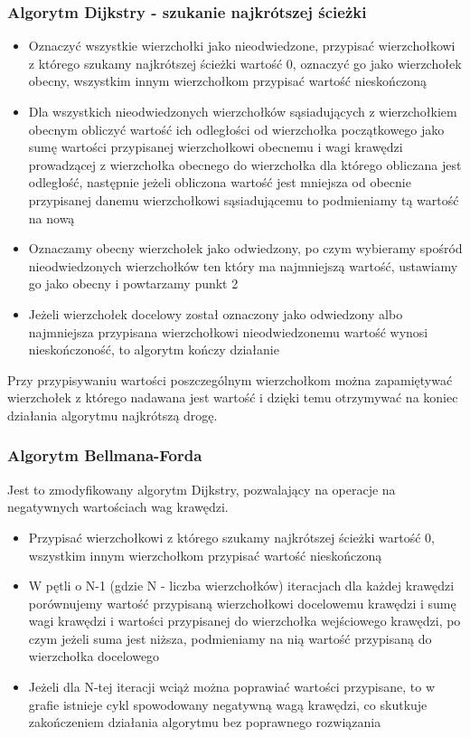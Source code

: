 \documentclass[a4paper,12pt]{article}
\newcommand\tab[1][1cm]{\hspace*{#1}}
\begin{document}
\subsubsection{Algorytm Dijkstry - szukanie najkrótszej ścieżki}
\tab
\begin{itemize}

\item Oznaczyć wszystkie wierzchołki jako nieodwiedzone, przypisać wierzchołkowi z którego szukamy najkrótszej ścieżki wartość 0, oznaczyć go jako wierzchołek obecny, wszystkim innym wierzchołkom przypisać wartość nieskończoną
\item Dla wszystkich nieodwiedzonych wierzchołków sąsiadujących z wierzchołkiem obecnym obliczyć wartość ich odległości od wierzchołka początkowego jako sumę wartości przypisanej wierzchołkowi obecnemu i wagi krawędzi prowadzącej z wierzchołka obecnego do wierzchołka dla którego obliczana jest odległość, następnie jeżeli obliczona wartość jest mniejsza od obecnie przypisanej danemu wierzchołkowi sąsiadującemu to podmieniamy tą wartość na nową
\item Oznaczamy obecny wierzchołek jako odwiedzony, po czym wybieramy spośród nieodwiedzonych wierzchołków ten który ma najmniejszą wartość, ustawiamy go jako obecny i powtarzamy punkt 2
\item Jeżeli wierzchołek docelowy został oznaczony jako odwiedzony albo najmniejsza przypisana wierzchołkowi nieodwiedzonemu wartość wynosi nieskończoność, to algorytm kończy działanie
\end{itemize}
Przy przypisywaniu wartości poszczególnym wierzchołkom można zapamiętywać wierzchołek z którego nadawana jest wartość i dzięki temu otrzymywać na koniec działania algorytmu najkrótszą drogę.

\subsubsection{Algorytm Bellmana-Forda}
\tab
Jest to zmodyfikowany algorytm Dijkstry, pozwalający na operacje na negatywnych wartościach wag krawędzi.
\begin{itemize}

\item Przypisać wierzchołkowi z którego szukamy najkrótszej ścieżki wartość 0, wszystkim innym wierzchołkom przypisać wartość nieskończoną
\item W pętli o N-1 (gdzie N - liczba wierzchołków) iteracjach dla każdej krawędzi porównujemy wartość przypisaną wierzchołkowi docelowemu krawędzi i sumę wagi krawędzi i wartości przypisanej do wierzchołka wejściowego krawędzi, po czym jeżeli suma jest niższa, podmieniamy na nią wartość przypisaną do wierzchołka docelowego
\item Jeżeli dla N-tej iteracji wciąż można poprawiać wartości przypisane, to w grafie istnieje cykl spowodowany negatywną wagą krawędzi, co skutkuje zakończeniem działania algorytmu bez poprawnego rozwiązania
\end{itemize}
\end{document}

